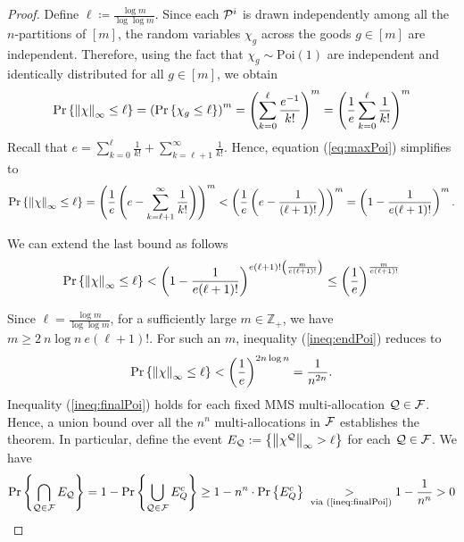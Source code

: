 \begin{proof}
Define $\ell \coloneqq \frac{\log m}{\log \log m}$. Since each $\mathcal{P}^i$ is drawn independently among all the $n$-partitions of $[m]$, the random variables $\chi_g$ across the goods $g \in [m]$ are independent. Therefore, using the fact that $\chi_g \sim \mathrm{Poi}(1)$ are independent and identically distributed for all $g \in [m]$, we obtain 
\begin{align}
    \Pr \left\{\left\|\chi\right\|_\infty \leq  \ell\right\} = \left(\Pr \left\{\chi_g \leq \ell\right\}\right)^m = \left(\sum_{k = 0}^{\ell} \frac{e^{-1}}{k!}\right)^m = \left(\frac{1}{e}\sum_{k = 0}^{\ell}\frac{1}{k!}\right)^m \label{eq:maxPoi}
\end{align}
Recall that $e = \sum_{k=0}^\ell \frac{1}{k!} + \sum_{k=\ell+1}^\infty \frac{1}{k!}$. 
 Hence, equation (\ref{eq:maxPoi}) simplifies to 
\begin{align*}
\Pr \left\{\left\|\chi\right\|_\infty \leq  \ell\right\} = \left(\frac{1}{e} \left(e- \sum_{k=\ell+1}^\infty \frac{1}{k!} \right)\right)^m < \left( \frac{1}{e} \left(e - \frac{1}{(\ell+1)!} \right) \right)^m = \left(1 - \frac{1}{e(\ell+1)!}\right)^m.    \end{align*}
 
We can extend the last bound as follows
\begin{align}
 \Pr \left\{\left\|\chi\right\|_\infty \leq  \ell\right\} < \left(1 - \frac{1}{e(\ell+1)!} \right)^{e(\ell+1)!\left(\frac{m}{e(\ell+1)!}\right)}  \leq \left(\frac{1}{e}\right)^{\frac{m}{e(\ell+1)!}} \label{ineq:endPoi}    
\end{align}
 
Since $\ell = \frac{\log m}{\log \log m}$, for a sufficiently large $m \in \mathbb{Z}_+$, we have $m \geq 2 \  n \log n \  e (\ell +1)! $. For such an $m$, inequality (\ref{ineq:endPoi}) reduces to 
\begin{align}
    \Pr \left\{\left\|\chi\right\|_\infty \leq  \ell\right\} <  \left(\frac{1}{e}\right)^{2n \log n} = \frac{1}{n^{2n}} \label{ineq:finalPoi}.
\end{align}
Inequality (\ref{ineq:finalPoi}) holds for each fixed MMS multi-allocation $\mathcal{Q} \in \mathcal{F}$. Hence, a union bound over all the $n^n$ multi-allocations in $\mathcal{F}$ establishes the theorem. In particular, define the event $E_{\mathcal{Q}}: = \left\{ \left\|\chi^{\mathcal{Q}}\right\|_\infty > \ell \right\}$ for each $\mathcal{Q} \in\mathcal{F}$. We have 
\begin{align*}
\Pr \left\{\bigcap_{\mathcal{Q} \in \mathcal{F}} E_{\mathcal{Q}}\right\} = 1- \Pr \left\{\bigcup_{\mathcal{Q} \in\mathcal{F}} E_Q^c\right\} \geq 1 - n^n \cdot \Pr \left\{E_Q^c\right\} \underset{\text{ via (\ref{ineq:finalPoi}})}{>} 1-\frac{1}{n^n} > 0    
\end{align*}



\end{proof}
